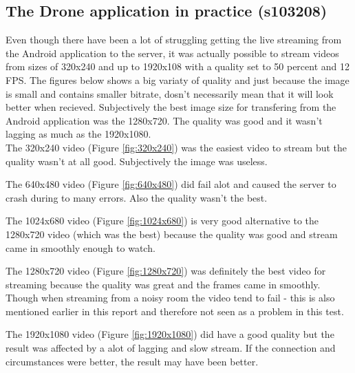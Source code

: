 \subsection{The Drone application in practice (s103208)}
Even though there have been a lot of struggling getting the live streaming from the Android application to the server, it was actually possible to stream videos from sizes of 320x240 and up to 1920x108 with a quality set to 50 percent and 12 FPS. The figures below shows a big variaty of quality and just because the image is small and contains smaller bitrate, dosn't necessarily mean that it will look better when recieved. Subjectively the best image size for transfering from the Android application was the 1280x720. The quality was good and it wasn't lagging as much as the 1920x1080.\\


The 320x240 video (Figure \ref{fig:320x240}) was the easiest video to stream but the quality wasn't at all good. Subjectively the image was useless.

The 640x480 video (Figure \ref{fig:640x480}) did fail alot and caused the server to crash during to many errors. Also the quality wasn't the best.

The 1024x680 video (Figure \ref{fig:1024x680}) is very good alternative to the 1280x720 video (which was the best) because the quality was good and stream came in smoothly enough to watch.

The 1280x720 video (Figure \ref{fig:1280x720}) was definitely the best video for streaming because the quality was great and the frames came in smoothly. Though when streaming from a noisy room the video tend to fail - this is also mentioned earlier in this report and therefore not seen as a problem in this test.

The 1920x1080 video (Figure \ref{fig:1920x1080}) did have a good quality but the result was affected by a alot of lagging and slow stream. If the connection and circumstances were better, the result may have been better.


















